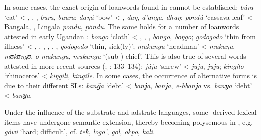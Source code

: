 \documentclass[output=paper]{langsci/langscibook}
\begin{document}
In some cases, the exact origin of {loanwords} found in   cannot be established: \textit{búra} ‘cat’ < , , ,  \textit{bura},  \textit{buura}; \textit{daŋá} ‘bow’ < ,  \textit{daŋ},  \textit{d'anga},  \textit{dhaŋ}; \textit{pondú} ‘cassava leaf’ < Bangala, , Lingala \textit{pondu},  \textit{pöndu}. The same holds for a number of {loanwords} attested in early Ugandan  \citep{Avram2017talk}: \textit{bongo} ‘cloth’ < , , ,  \textit{bongo},  \textit{boŋgo}; \textit{godogodo} ‘thin from illness’ < , , , , , ,  \textit{godogodo} ‘thin, sick(ly)’; \textit{mukungu} ‘headman’ <  \textit{mukuŋu},  \textit{mʊkʊ}\textit{ŋgʊ},  \textit{o-mukungu},  \textit{mukungu} ‘(sub-) chief’. This is also true of several  words attested in more recent sources (\citealt{Wellens2003}; \citealt{Nakao2012}: 133–134): \textit{júju} ‘shrew’ <  \textit{juju},  \textit{juju}; \textit{kingílo} ‘rhinoceros’ <  \textit{kiŋgili},  \textit{kingile}. In some cases, the occurrence of alternative forms is due to their different SLs: \textit{ban\textbf{ǧ}a} ‘debt’ <  \textit{ban\textbf{j}a},  \textit{ban\textbf{j}a},  \textit{e-bban\textbf{j}a} vs. \textit{ban\textbf{y}a} ‘debt’ <  \textit{ban\textbf{y}a}. 

Under the influence of the {substrate} and {adstrate} languages, some -derived lexical items have undergone semantic {extension}, thereby becoming polysemous in   \citep[136]{Nakao2012}, e.g. \textit{gówi} ‘hard; difficult’, cf.  \textit{tek},  \textit{logo’},  \textit{gol},  \textit{okpo},  \textit{kali}.
\end{document}
